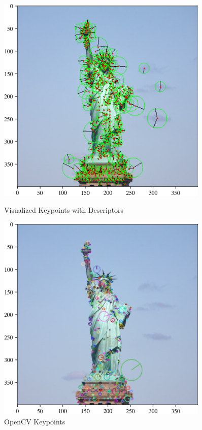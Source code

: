 \documentclass[11pt,a4paper]{article}
\begin{document}
\begin{figure}[ht!]
  \centering
  \begin{minipage}{0.45\textwidth}
    \centering
    \includegraphics[width=0.9\textwidth]{figs/keypoints_with_descriptors.png} %
    \caption{Visualized Keypoints with Descriptors}
  \end{minipage}
  \quad
  \begin{minipage}{0.45\textwidth}
    \centering
    \includegraphics[width=0.9\textwidth]{figs/opencv_sift.png} %
    \caption{OpenCV Keypoints}
  \end{minipage}
\end{figure}
\end{document}
